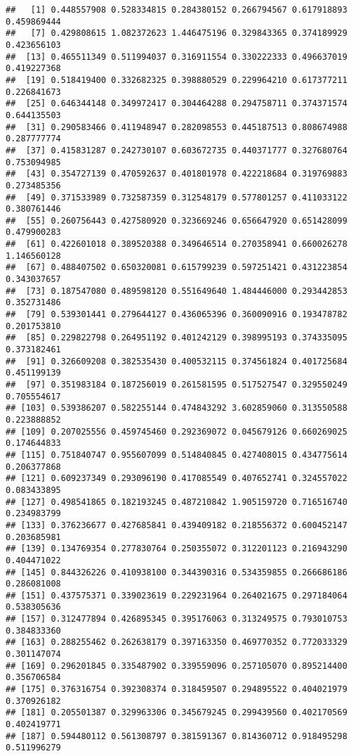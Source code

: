 \documentclass[
]{article}
\begin{document}
\begin{verbatim}
##   [1] 0.448557908 0.528334815 0.284380152 0.266794567 0.617918893 0.459869444
##   [7] 0.429808615 1.082372623 1.446475196 0.329843365 0.374189929 0.423656103
##  [13] 0.465511349 0.511994037 0.316911554 0.330222333 0.496637019 0.419227368
##  [19] 0.518419400 0.332682325 0.398880529 0.229964210 0.617377211 0.226841673
##  [25] 0.646344148 0.349972417 0.304464288 0.294758711 0.374371574 0.644135503
##  [31] 0.290583466 0.411948947 0.282098553 0.445187513 0.808674988 0.287777774
##  [37] 0.415831287 0.242730107 0.603672735 0.440371777 0.327680764 0.753094985
##  [43] 0.354727139 0.470592637 0.401801978 0.422218684 0.319769883 0.273485356
##  [49] 0.371533989 0.732587359 0.312548179 0.577801257 0.411033122 0.380761446
##  [55] 0.260756443 0.427580920 0.323669246 0.656647920 0.651428099 0.479900283
##  [61] 0.422601018 0.389520388 0.349646514 0.270358941 0.660026278 1.146560128
##  [67] 0.488407502 0.650320081 0.615799239 0.597251421 0.431223854 0.343037657
##  [73] 0.187547080 0.489598120 0.551649640 1.484446000 0.293442853 0.352731486
##  [79] 0.539301441 0.279644127 0.436065396 0.360090916 0.193478782 0.201753810
##  [85] 0.229822798 0.264951192 0.401242129 0.398995193 0.374335095 0.373182461
##  [91] 0.326609208 0.382535430 0.400532115 0.374561824 0.401725684 0.451199139
##  [97] 0.351983184 0.187256019 0.261581595 0.517527547 0.329550249 0.705554617
## [103] 0.539386207 0.582255144 0.474843292 3.602859060 0.313550588 0.223888852
## [109] 0.207025556 0.459745460 0.292369072 0.045679126 0.660269025 0.174644833
## [115] 0.751840747 0.955607099 0.514840845 0.427408015 0.434775614 0.206377868
## [121] 0.609237349 0.293096190 0.417085549 0.407652741 0.324557022 0.083433895
## [127] 0.498541865 0.182193245 0.487210842 1.905159720 0.716516740 0.234983799
## [133] 0.376236677 0.427685841 0.439409182 0.218556372 0.600452147 0.203685981
## [139] 0.134769354 0.277830764 0.250355072 0.312201123 0.216943290 0.404471022
## [145] 0.844326226 0.410938100 0.344390316 0.534359855 0.266686186 0.286081008
## [151] 0.437575371 0.339023619 0.229231964 0.264021675 0.297184064 0.538305636
## [157] 0.312477894 0.426895345 0.395176063 0.313249575 0.793010753 0.384833360
## [163] 0.288255462 0.262638179 0.397163350 0.469770352 0.772033329 0.301147074
## [169] 0.296201845 0.335487902 0.339559096 0.257105070 0.895214400 0.356706584
## [175] 0.376316754 0.392308374 0.318459507 0.294895522 0.404021979 0.370926182
## [181] 0.205501387 0.329963306 0.345679245 0.299439560 0.402170569 0.402419771
## [187] 0.594480112 0.561308797 0.381591367 0.814360712 0.918495298 0.511996279

\end{verbatim}
\end{document}
